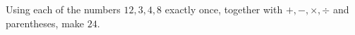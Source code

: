 Using each of the numbers $12,3,4,8$ exactly once, together with $+,-,\times,\div$ and parentheses, make $24$.
